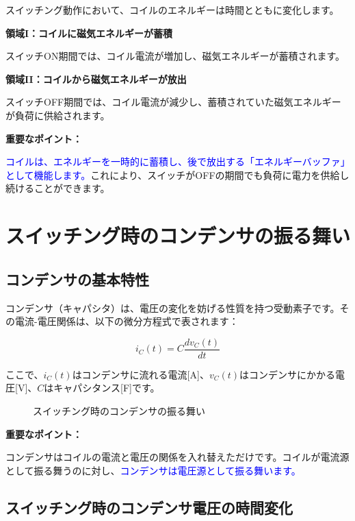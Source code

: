 スイッチング動作において、コイルのエネルギーは時間とともに変化します。

\textbf{領域I：コイルに磁気エネルギーが蓄積}

スイッチON期間では、コイル電流が増加し、磁気エネルギーが蓄積されます。

\textbf{領域II：コイルから磁気エネルギーが放出}

スイッチOFF期間では、コイル電流が減少し、蓄積されていた磁気エネルギーが負荷に供給されます。

\textbf{重要なポイント：}

\textcolor{blue}{コイルは、エネルギーを一時的に蓄積し、後で放出する「エネルギーバッファ」として機能します。}これにより、スイッチがOFFの期間でも負荷に電力を供給し続けることができます。

\section{スイッチング時のコンデンサの振る舞い}

\subsection{コンデンサの基本特性}

コンデンサ（キャパシタ）は、電圧の変化を妨げる性質を持つ受動素子です。その電流-電圧関係は、以下の微分方程式で表されます：

\begin{equation}
i_C(t) = C \frac{dv_C(t)}{dt}
\end{equation}

ここで、$i_C(t)$はコンデンサに流れる電流[A]、$v_C(t)$はコンデンサにかかる電圧[V]、$C$はキャパシタンス[F]です。

\begin{figure}[H]
\centering
{}
\caption{スイッチング時のコンデンサの振る舞い}
\label{fig:ch04_capacitor_switching}
\end{figure}

\textbf{重要なポイント：}

コンデンサはコイルの電流と電圧の関係を入れ替えただけです。コイルが電流源として振る舞うのに対し、\textcolor{blue}{コンデンサは電圧源として振る舞います。}

\subsection{スイッチング時のコンデンサ電圧の時間変化}

